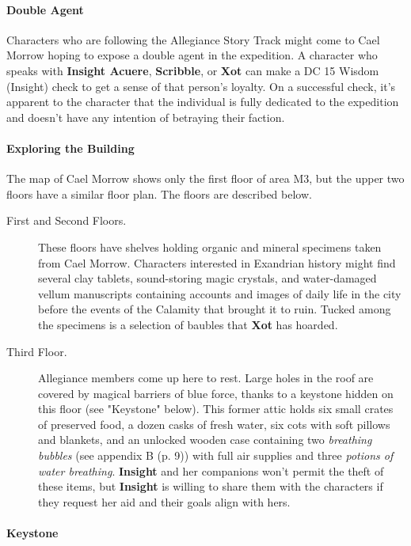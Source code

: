 \documentclass[a4paper, 11pt, bg=full, twocolumn, nooutline]{dndbook}
\begin{document}
\paragraph{Double Agent}

Characters who are following the Allegiance Story Track might come to Cael Morrow hoping to expose a double agent in the expedition. A character who speaks with \textbf{Insight Acuere}, \textbf{Scribble}, or \textbf{Xot} can make a DC 15 Wisdom (Insight) check to get a sense of that person's loyalty. On a successful check, it's apparent to the character that the individual is fully dedicated to the expedition and doesn't have any intention of betraying their faction.

\paragraph{Exploring the Building}

The map of Cael Morrow shows only the first floor of area M3, but the upper two floors have a similar floor plan. The floors are described below.

\begin{description}
\item[First and Second Floors.] These floors have shelves holding organic and mineral specimens taken from Cael Morrow. Characters interested in Exandrian history might find several clay tablets, sound-storing magic crystals, and water-damaged vellum manuscripts containing accounts and images of daily life in the city before the events of the Calamity that brought it to ruin. Tucked among the specimens is a selection of baubles that \textbf{Xot} has hoarded.
\item[Third Floor.] Allegiance members come up here to rest. Large holes in the roof are covered by magical barriers of blue force, thanks to a keystone hidden on this floor (see "Keystone" below). This former attic holds six small crates of preserved food, a dozen casks of fresh water, six cots with soft pillows and blankets, and an unlocked wooden case containing two \textit{breathing bubbles} (see appendix B (p. 9)) with full air supplies and three \textit{potions of water breathing}. \textbf{Insight} and her companions won't permit the theft of these items, but \textbf{Insight} is willing to share them with the characters if they request her aid and their goals align with hers.
\end{description}

\paragraph{Keystone}
\end{document}
